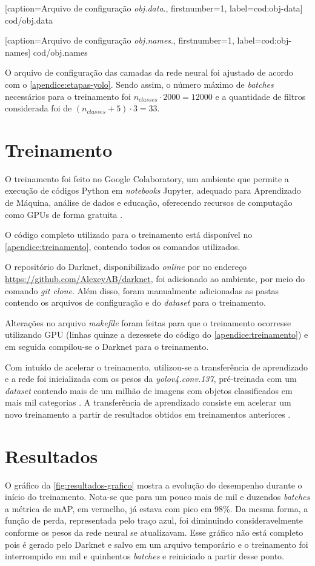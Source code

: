 
[caption=Arquivo de configuração \textit{obj.data}.,
firstnumber=1,
label=cod:obj-data]
{cod/obj.data}


[caption=Arquivo de configuração \textit{obj.names}.,
firstnumber=1,
label=cod:obj-names]
{cod/obj.names}

O arquivo de configuração das camadas da rede neural foi ajustado de acordo com o \autoref{apendice:etapas-yolo}. Sendo assim, o número máximo de \textit{batches} necessários para o treinamento foi $n_{classes} \cdot 2000 = 12000$ e a quantidade de filtros considerada foi de $(n_{classes} + 5) \cdot 3 = 33$.

\section{Treinamento} \label{cap:treinamento-treinamento}
O treinamento foi feito no Google Colaboratory, um ambiente que permite a execução de códigos Python em \textit{notebooks} Jupyter, adequado para Aprendizado de Máquina, análise de dados e educação, oferecendo recursos de computação como GPUs de forma gratuita \cite{ref:Colab}.

O código completo utilizado para o treinamento está disponível no \autoref{apendice:treinamento}, contendo todos os comandos utilizados.

O repositório do Darknet, disponibilizado \textit{online} por  no endereço \url{https://github.com/AlexeyAB/darknet}, foi adicionado ao ambiente, por meio do comando \textit{git clone}. Além disso, foram manualmente adicionadas as pastas contendo os arquivos de configuração e do \textit{dataset} para o treinamento.

Alterações no arquivo \textit{makefile} foram feitas para que o treinamento ocorresse utilizando GPU (linhas quinze a dezessete do código do \autoref{apendice:treinamento}) e em seguida compilou-se o Darknet para o treinamento.

Com intuído de acelerar o treinamento, utilizou-se a transferência de aprendizado e a rede foi inicializada com os pesos da \textit{yolov4.conv.137}, pré-treinada com um \textit{dataset} contendo mais de um milhão de imagens com objetos classificados em mais mil categorias \cite{ref:Redmon-et-al}. A transferência de aprendizado consiste em acelerar um novo treinamento a partir de resultados obtidos em treinamentos anteriores \cite{ref:Cai-Bileschi-Nielsen}.

\section{Resultados} \label{cap:treinamento-resultados}
O gráfico da \autoref{fig:resultados-grafico} mostra a evolução do desempenho durante o início do treinamento. Nota-se que para um pouco mais de mil e duzendos \textit{batches} a métrica de mAP, em vermelho, já estava com pico em 98\%. Da mesma forma, a função de perda, representada pelo traço azul, foi diminuindo consideravelmente conforme os pesos da rede neural se atualizavam. Esse gráfico não está completo pois é gerado pelo Darknet e salvo em um arquivo temporário e o treinamento foi interrompido em mil e quinhentos \textit{batches} e reiniciado a partir desse ponto.

